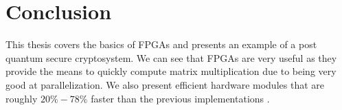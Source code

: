 \chapter{Conclusion\label{conclusion}}
This thesis covers the basics of FPGAs and presents an example of a post
quantum secure cryptosystem. We can see that FPGAs are very useful as they
provide the means to quickly compute matrix multiplication due to being very
good at parallelization. We also present efficient hardware modules that
are roughly $20\% - 78\%$ faster than the previous implementations
\citep{FPGA_Post_Quantum_Primitives}.
